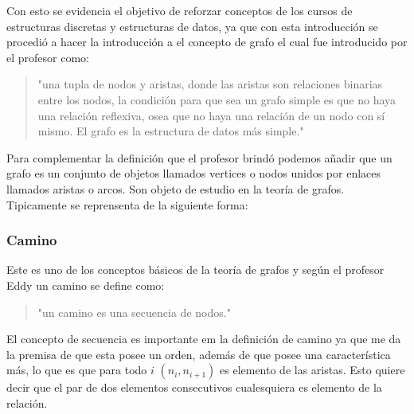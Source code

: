 \documentclass[10pt,a4paper]{article}
\begin{document}
	Con esto se evidencia el objetivo de reforzar conceptos de los cursos de estructuras discretas y estructuras de datos, ya que con esta introducción se procedió a hacer la introducción a el concepto de grafo el cual fue introducido por el profesor como:\\
	\begin{quotation}
	"una tupla de nodos y aristas, donde las aristas son relaciones binarias entre los nodos, la condición para que sea un grafo simple es que no haya una relación reflexiva, osea que no haya una relación de un nodo con sí mismo. El grafo es la estructura de datos más simple."\\
	\end{quotation}
	\cite{Graph}
	Para complementar la definición que el profesor brindó podemos añadir que un grafo es un conjunto de objetos llamados vertices o nodos unidos por enlaces llamados aristas o arcos. Son objeto de estudio en la teoría de grafos. Tipicamente se reprensenta de la siguiente forma: 
\begin{center}
\end{center}
\subsubsection{Camino}
	Este es uno de los conceptos básicos de la teoría de grafos y según el profesor Eddy un camino se define como:\\ 
\begin{quote}
	"un camino es una secuencia de nodos."\\
	\end{quote}
	
	El concepto de secuencia es importante em la definición de camino ya que me da la premisa de que esta posee un orden, además de que posee una característica más, lo que es que para todo $i$ $(n_i, n_{i+1})$ es elemento de las aristas. Esto quiere decir que el par de dos elementos consecutivos cualesquiera es elemento de la relación.\\
	
\end{document}
